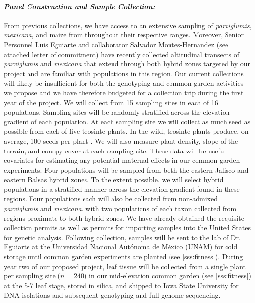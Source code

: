 \paragraph{\emph{Panel Construction and Sample Collection:}}
From previous collections, we have access to an extensive sampling of \emph{parviglumis}, \emph{mexicana}, and maize from throughout their respective ranges.  Moreover, Senior Personnel Luis Eguiarte and collaborator Salvador Montes-Hernandez (see attached letter of commitment) have recently collected altitudinal transects of \emph{parviglumis} and \emph{mexicana} that extend through both hybrid zones targeted by our project \citep{Diez2013} and are  familiar with populations in this region.  Our current collections will likely be insufficient for both the genotyping and common garden activities we propose  and we have therefore budgeted for a collection trip during the first year of the project.  We will collect from 15 sampling sites in each of 16 populations.  Sampling sites will be randomly stratified across the elevation gradient of each population.  At each sampling site we will collect as much seed as possible from each of five teosinte plants.  In the wild, teosinte plants produce, on average, 100 seeds per plant \citep{wilkes1967teosinte}.  We will also measure plant density, slope of the terrain, and canopy cover at each sampling site.  These data will be useful covariates for estimating any potential maternal effects in our common garden experiments.  Four populations will be sampled from both the eastern Jalisco and eastern Balsas hybrid zones.  To the extent possible, we will select hybrid populations in a stratified manner across the elevation gradient found in these regions. Four populations each will also be collected from non-admixed \emph{parviglumis} and \emph{mexicana}, with two populations of each taxon collected from regions proximate to both hybrid zones.  We have already obtained the requisite collection permits as well as permits for importing samples into the United States for genetic analysis. Following collection, samples will be sent to the lab of Dr. Eguiarte at the Universidad Nacional Aut\'{o}noma de M\'{e}xico (UNAM) for cold storage until common garden experiments are planted (see \ref{sss:fitness}).  During year two of our proposed project, leaf tissue will be collected from a single plant per sampling site ($n=240$) in our mid-elevation common garden (see \ref{sss:fitness}) at the 5-7 leaf stage, stored in silica, and shipped to Iowa State University for DNA isolations and subsequent genotyping and full-genome sequencing.

